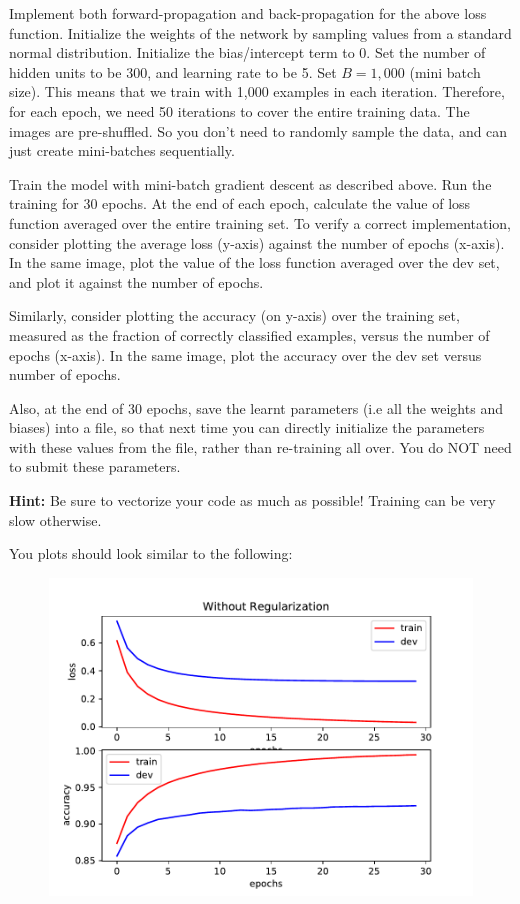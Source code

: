 \item {} 

Implement both forward-propagation and back-propagation for the above loss function.
Initialize the weights of the network by sampling values from a standard normal
distribution. Initialize the bias/intercept term to 0.
Set the number of hidden units to be 300, and learning rate to be 5. Set $B = 1,000$
(mini batch size). This means that we train with 1,000 examples in each iteration.
Therefore, for each epoch, we need 50 iterations to cover the entire training data.
The images are pre-shuffled. So you don't need to randomly sample the data, and can
just create mini-batches sequentially.


Train the model with mini-batch gradient descent
as described above. Run the training for 30 epochs. At the end of each epoch, calculate
the value of loss function averaged over the entire training set.  To verify a correct implementation, consider plotting the average loss (y-axis) against the number of epochs (x-axis). In the same image, plot the value of the loss function averaged over the dev set, and plot it against the number of epochs.

Similarly, consider plotting the accuracy (on y-axis) over the training set,
measured as the fraction of correctly classified examples, versus the number of epochs
(x-axis). In the same image, plot the accuracy over the dev set versus number of epochs.

Also, at the end of 30 epochs, save the learnt parameters (i.e all the weights and biases)
into a file, so that next time you can directly initialize the parameters with
these values from the file, rather than re-training all over. You do NOT need to
submit these parameters.


\textbf{Hint:} Be sure to vectorize your code as much as possible! Training can be
very slow otherwise.

\clearpage\newpage

You plots should look similar to the following:

\begin{figure}[H]
    \centering
    \includegraphics[scale=0.75]{mnist/baseline.pdf}
\end{figure}
